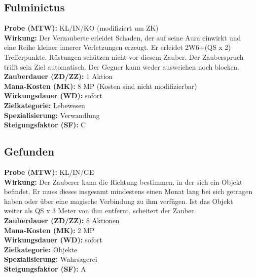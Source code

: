 \subsection{Fulminictus}
\label{chap:fulminictus}
\textbf{Probe (MTW):} KL/IN/KO (modifiziert um ZK) \\
\textbf{Wirkung:} Der Verzauberte erleidet Schaden, der auf seine Aura einwirkt und eine Reihe kleiner innerer Verletzungen erzeugt. Er erleidet 2W6+(QS x 2) Trefferpunkte. Rüstungen schützen nicht vor diesem Zauber. Der Zauberspruch trifft sein Ziel automatisch. Der Gegner kann weder ausweichen noch blocken. \\
\textbf{Zauberdauer (ZD/ZZ):} 1 Aktion \\
\textbf{Mana-Kosten (MK):} 8 MP (Kosten sind nicht modifizierbar) \\
\textbf{Wirkungsdauer (WD):} sofort \\
\textbf{Zielkategorie:} Lebewesen \\
\textbf{Spezialisierung:} Verwandlung \\
\textbf{Steigungsfaktor (SF):} C


\subsection{Gefunden}
\label{chap:gefunden}
\textbf{Probe (MTW):} KL/IN/GE \\
\textbf{Wirkung:} Der Zauberer kann die Richtung bestimmen, in der sich ein Objekt befindet. Er muss dieses insgesamt mindestens einen Monat lang bei sich getragen haben oder über eine magische Verbindung zu ihm verfügen. Ist das Objekt weiter als QS x 3 Meter von ihm entfernt, scheitert der Zauber.\\
\textbf{Zauberdauer (ZD/ZZ):} 8 Aktionen \\
\textbf{Mana-Kosten (MK):} 2 MP \\
\textbf{Wirkungsdauer (WD):} sofort \\
\textbf{Zielkategorie:} Objekte \\
\textbf{Spezialisierung:} Wahrsagerei \\
\textbf{Steigungsfaktor (SF):} A


